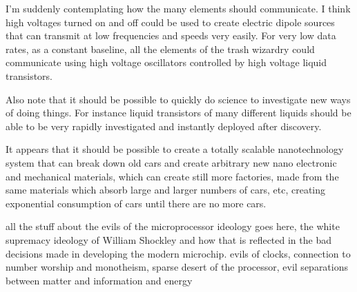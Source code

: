 I'm suddenly contemplating how the many elements should communicate. I
think high voltages turned on and off could be used to create electric
dipole sources that can transmit at low frequencies and speeds very
easily. For very low data rates, as a constant baseline, all the
elements of the trash wizardry could communicate using high voltage
oscillators controlled by high voltage liquid transistors.

Also note that it should be possible to quickly do science to
investigate new ways of doing things. For instance liquid transistors of
many different liquids should be able to be very rapidly investigated
and instantly deployed after discovery.

It appears that it should be possible to create a totally scalable
nanotechnology system that can break down old cars and create arbitrary
new nano electronic and mechanical materials, which can create still
more factories, made from the same materials which absorb large and
larger numbers of cars, etc, creating exponential consumption of cars
until there are no more cars.

all the stuff about the evils of the microprocessor ideology goes here,
the white supremacy ideology of William Shockley and how that is
reflected in the bad decisions made in developing the modern microchip.
evils of clocks, connection to number worship and monotheism, sparse
desert of the processor, evil separations between matter and information
and energy

